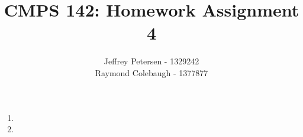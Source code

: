 \documentclass{article}
\title{CMPS 142: Homework Assignment 4}
\author{Jeffrey Petersen - 1329242\\Raymond Colebaugh - 1377877}
\begin{document}
\maketitle
\begin{enumerate}
        \item 
        \item 
\end{enumerate}
\end{document}
